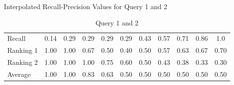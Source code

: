 \begin{table}[!htbp]
	\caption{Interpolated Recall-Precision Values for Query 1 and 2} \label{tab:precision-recall}
	\begin{center}
	\vspace{-5mm}
		\begin{tabular}{ l  c  c  c  c  c  c  c  c  c  c}
			Recall & 0.14 & 0.29 & 0.29 & 0.29 & 0.29 & 0.43 & 0.57 & 0.71 & 0.86 & 1.0\\
			\cline{2-11}
			Ranking 1 & 1.00 & 1.00 & 0.67 & 0.50 & 0.40 & 0.50 & 0.57 & 0.63 & 0.67 & 0.70\\
			\cline{2-11}
			Ranking 2 & 1.00 & 1.00 & 1.00 & 0.75 & 0.60 & 0.50 & 0.43 & 0.38 & 0.33 & 0.30\\
			\cline{2-11}
			Average & 1.00 & 1.00 & 0.83 & 0.63 & 0.50 & 0.50 & 0.50 & 0.50 & 0.50 & 0.50\\
			\cline{2-11}
		\end{tabular}
	\caption*{\scriptsize Query 1 and 2 }
	 \end{center}
\end{table}
